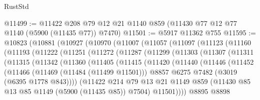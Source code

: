 \begin{lexlean}{RustStd}
\begin{coremodule}
@11499 := @11422 @208 @79 @12 @21 @1140 @859 (@11430 @77 @12 @77 @1140 (@5900 (@11435 @77)) @7470)
@11501 := @5917 @11362 @755
@11595 := @10823
    (@10881
      (@10927
        (@10970
          (@11007
            (@11057
              (@11097
                (@11123
                  (@11160
                    (@11193
                      (@11222
                        (@11251
                          (@11272
                            (@11287
                              (@11299
                                (@11303
                                  (@11307
                                    (@11311
                                      (@11315
                                        (@11342
                                          (@11360
                                            (@11405
                                              (@11415
                                                (@11420
                                                  (@11440
                                                    (@11446
                                                      (@11452
                                                        (@11466
                                                          (@11469 (@11484 (@11499 @11501)))
                                                          @8857
                                                          @6275
                                                          @7482
                                                          (@3019 (@6395 @1778 @843))))
                                                      (@11422
                                                        @214
                                                        @79
                                                        @13
                                                        @21
                                                        @1149
                                                        @859
                                                        (@11430
                                                          @85
                                                          @13
                                                          @85
                                                          @1149
                                                          (@5900 (@11435 @85))
                                                          @7504)
                                                        @11501))))
                                                @8895
                                                @8898

\end{coremodule}
\end{lexlean}
